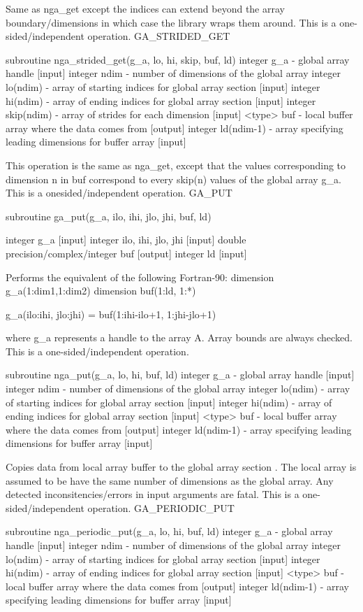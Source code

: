 Same as nga\_get except the indices can extend beyond the array boundary/dimensions
in which case the library wraps them around. This is a one-sided/independent
operation. GA\_STRIDED\_GET

subroutine nga\_strided\_get(g\_a, lo, hi, skip, buf, ld) integer
g\_a - global array handle {[}input{]} integer ndim - number of dimensions
of the global array integer lo(ndim) - array of starting indices for
global array section {[}input{]} integer hi(ndim) - array of ending
indices for global array section {[}input{]} integer skip(ndim) -
array of strides for each dimension {[}input{]} <type> buf - local
buffer array where the data comes from {[}output{]} integer ld(ndim-1)
- array specifying leading dimensions for buffer array {[}input{]}

This operation is the same as nga\_get, except that the values corresponding
to dimension n in buf correspond to every skip(n) values of the global
array g\_a. This is a onesided/independent operation. GA\_PUT

subroutine ga\_put(g\_a, ilo, ihi, jlo, jhi, buf, ld)

integer g\_a {[}input{]} integer ilo, ihi, jlo, jhi {[}input{]} double
precision/complex/integer buf {[}output{]} integer ld {[}input{]}

Performs the equivalent of the following Fortran-90: dimension g\_a(1:dim1,1:dim2)
dimension buf(1:ld, 1:{*})

g\_a(ilo:ihi, jlo:jhi) = buf(1:ihi-ilo+1, 1:jhi-jlo+1)

where g\_a represents a handle to the array A. Array bounds are always
checked. This is a one-sided/independent operation.

subroutine nga\_put(g\_a, lo, hi, buf, ld) integer g\_a - global array
handle {[}input{]} integer ndim - number of dimensions of the global
array integer lo(ndim) - array of starting indices for global array
section {[}input{]} integer hi(ndim) - array of ending indices for
global array section {[}input{]} <type> buf - local buffer array where
the data comes from {[}output{]} integer ld(ndim-1) - array specifying
leading dimensions for buffer array {[}input{]}

Copies data from local array buffer to the global array section .
The local array is assumed to be have the same number of dimensions
as the global array. Any detected inconsitencies/errors in input arguments
are fatal. This is a one-sided/independent operation. GA\_PERIODIC\_PUT

subroutine nga\_periodic\_put(g\_a, lo, hi, buf, ld) integer g\_a
- global array handle {[}input{]} integer ndim - number of dimensions
of the global array integer lo(ndim) - array of starting indices for
global array section {[}input{]} integer hi(ndim) - array of ending
indices for global array section {[}input{]} <type> buf - local buffer
array where the data comes from {[}output{]} integer ld(ndim-1) -
array specifying leading dimensions for buffer array {[}input{]}


